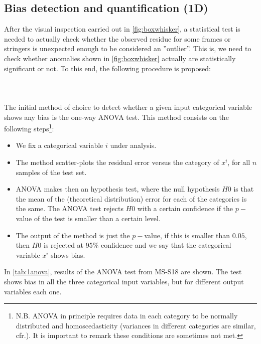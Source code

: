 \subsection{Bias detection and quantification (1D)}\label{subsec:biasinput1d}
After the visual inspection carried out in \autoref{fig:boxwhisker}, a statistical test is needed to actually check whether the observed residue for some frames or stringers is unexpected enough to be considered an ''outlier''. This is, we need to check whether anomalies shown in \autoref{fig:boxwhisker} actually are statistically significant or not. To this end, the following procedure is proposed:\\

\paragraph{ \\}
The initial method of choice to detect whether a given input categorical variable shows any bias is the one-way ANOVA test\cite{kim2017understanding}. This method consists on the following steps\footnote{N.B. ANOVA in principle requires data in each category to be normally distributed and homoscedasticity (variances in different categories are similar, cfr.\cite[p. 374]{jobson2012applied}). It is important to remark these conditions are sometimes not met.}:
\begin{itemize}
	\item We fix a categorical variable $i$ under analysis.
	\item The method scatter-plots the residual error versus the category of $x^i$, for all $n$ samples of the test set.
	\item ANOVA makes then an hypothesis test, where the null hypothesis $H0$ is that the mean of the (theoretical distribution) error for each of the categories is the same. The ANOVA test rejects $H0$ with a certain confidence if the $p-$value of the test is smaller than a certain level.
	\item The output of the method is just the $p-$value, if this is smaller than $0.05$,  then $H0$ is rejected at 95\% confidence and we say that the categorical variable $x^i$ shows bias.\\
\end{itemize}
%
\indent In \autoref{tab:1anova}, results of the ANOVA test from MS-S18 are shown. The test shows bias in all the three categorical input variables, but for different output variables each one.\\
